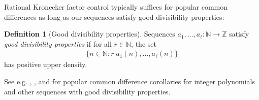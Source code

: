 \documentclass[11pt]{amsart}
\newtheorem{proposition}[lemma]{Proposition}
\theoremstyle{definition}
\newtheorem{definition}[lemma]{Definition}
\newcommand{\N}{{\mathbb N}}
\newcommand{\Z}{{\mathbb Z}}
\newcommand{\CX}{{\mathcal X}}
\newcommand{\bv}{{\mathbf{v}}}
\newcommand{\veps}{\varepsilon}
\newcommand{\1}{{\mathbf{1}}}
\begin{document}
Rational Kronecker factor control typically suffices for popular common differences as long as our sequences satisfy good divisibility properties:
\begin{definition}[Good divisibility properties]
    Sequences $a_1, \ldots, a_\ell:\N\to\Z$ satisfy \emph{good divisibility properties} if for all $r\in\N$, the set
    \begin{align*}
        \{n\in\N\colon r|a_1(n), \ldots, a_\ell(n)\}
    \end{align*}
    has positive upper density.
\end{definition}
See e.g. \cite[Theorem 1.3, Corollary 1.7]{FrKr06}, \cite[Corollaries 2.11 and 2.12]{FrKu22a}, and \cite[Theorem 3.4]{FrKu22c} for popular common difference corollaries for integer polynomials and other sequences with good divisibility properties. 

\end{document}
